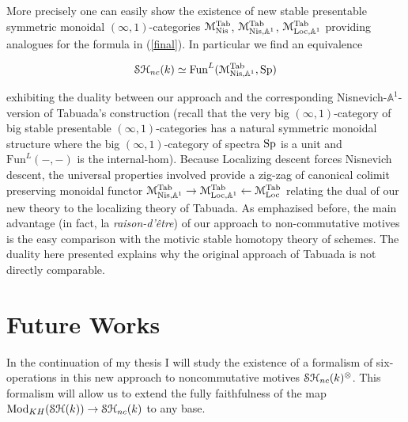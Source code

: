 \begin{refsection}
More precisely  one can easily show the existence of new stable presentable symmetric monoidal  $(\infty,1)$-categories $\mathcal{M}^\mathrm{Tab}_\mathrm{Nis}$, $\mathcal{M}^\mathrm{Tab}_{\mathrm{Nis}, \mathbb{A}^1}$, $\mathcal{M}^\mathrm{Tab}_{\mathrm{Loc}, \mathbb{A}^1}$ providing analogues for the formula in (\ref{final}). In particular we find an equivalence

\begin{equation}
 \mathcal{S}\mathcal{H}_{nc}(k)\simeq \mathrm{Fun}^{L}(\mathcal{M}^\mathrm{Tab}_{\mathrm{Nis}, \mathbb{A}^1}, \mathrm{Sp})
\end{equation}

\noindent exhibiting the duality between our approach and the corresponding Nisnevich-$\mathbb{A}^1$-version of Tabuada's construction (recall that the very big $(\infty,1)$-category of big stable presentable $(\infty,1)$-categories has a natural symmetric monoidal structure \cite[6.3.2.10, 6.3.2.18 and 6.3.1.17]{ha} where the big $(\infty,1)$-category of spectra $\mathrm{Sp}$ is a unit and $\mathrm{Fun}^{L}(-,-)$ is the internal-hom).  Because Localizing descent forces Nisnevich descent, the universal properties involved provide a zig-zag of canonical colimit preserving monoidal functor $\mathcal{M}^\mathrm{Tab}_{\mathrm{Nis},\mathbb{A}^1}\rightarrow  \mathcal{M}^\mathrm{Tab}_{\mathrm{Loc}, \mathbb{A}^1}\leftarrow \mathcal{M}^\mathrm{Tab}_\mathrm{Loc}$ relating the dual of our new theory to the localizing theory of Tabuada. As emphazised before, the main advantage (in fact, la \emph{raison-d'\^etre}) of our approach to non-commutative motives is the easy comparison with the motivic stable homotopy theory of schemes. The duality here presented explains why the original approach of Tabuada is not directly comparable.


\section{Future Works}

In the continuation of my thesis I will study the existence of a formalism of six-operations in this new approach to noncommutative motives $\mathcal{S}\mathcal{H}_{nc}(k)^{\otimes}$. This formalism will allow us to extend the fully faithfulness of the map $\mathrm{Mod}_{KH}(\mathcal{S}\mathcal{H}(k))\to \mathcal{S}\mathcal{H}_{nc}(k)$ to any base.


\printbibliography[heading = local]

\end{refsection}
